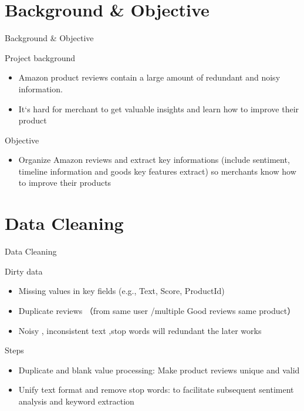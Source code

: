 \documentclass[serif, aspectratio=169]{beamer}
\begin{document}

\section{Background \& Objective}
\begin{frame}{Background \& Objective}
	\begin{block}{Project background}
		\begin{itemize}
			\item Amazon product reviews contain a large amount of redundant and noisy information.
			\item It`s hard for merchant to get valuable insights and learn how to improve their product
		\end{itemize}
	\end{block}
	\begin{block}{Objective}
		\begin{itemize}
			\item Organize Amazon reviews and extract key informations (include sentiment, timeline information and goods key features extract)  so merchants know how to improve their products
		\end{itemize}
	\end{block}
\end{frame}

\section{Data Cleaning}

\begin{frame}{Data Cleaning}
	\begin{block}{Dirty data}
		\begin{itemize}
			\item Missing values in key fields (e.g., Text, Score, ProductId)
			\item Duplicate reviews （from same user /multiple Good reviews same product）
			\item Noisy , inconsistent text ,stop words will redundant the later works
		\end{itemize}
	\end{block}
    
	\begin{block}{Steps}
		\begin{itemize}
			\item Duplicate and blank value processing: Make product reviews unique and valid
			\item Unify text format and remove stop words: to facilitate subsequent sentiment analysis and keyword extraction
		\end{itemize}
	\end{block}
\end{frame}
\end{document}

